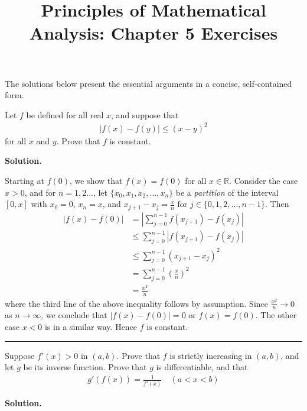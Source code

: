 \documentclass[12pt]{article}
\title{Principles of Mathematical Analysis: Chapter 5 Exercises}
\date{}
\theoremstyle{definition}
\begin{document}
\maketitle
\noindent The solutions below present the essential arguments in a concise, self-contained form.

Let $f$ be defined for all real $x$, and suppose that
\begin{align*}
\left\vert f(x)-f(y)\right\vert\le(x-y)^2
\end{align*}
for all $x$ and $y$. Prove that $f$ is constant.

\smallskip
\noindent\textbf{Solution.}\quad

Starting at $f(0)$, we show that $f(x)=f(0)$ for all $x\in \mathbb{R}$. Consider the case $x>0$, and for $n=1,2\ldots$, let $\{x_0,x_1,x_2,\ldots,x_n\}$ be a \textit{partition} of the interval $[0,x]$ with $x_0=0$, $x_n=x$, and $x_{j+1}-x_j=\frac{x}{n}$ for $j\in\{0,1,2,\ldots,n-1\}$. Then
\begin{align*}
\left\vert f(x)-f(0)\right\vert
&=\left\vert \sum_{j=0}^{n-1}f(x_{j+1})-f(x_j)\right\vert \\
&\le\sum_{j=0}^{n-1}\left\vert f(x_{j+1})-f(x_j)\right\vert \\
&\le\sum_{j=0}^{n-1}\left(x_{j+1}-x_j\right)^2 \\
&=\sum_{j=0}^{n-1}\left(\frac{x}{n}\right)^2 \\
&=\frac{x^2}{n}
\end{align*}
where the third line of the above inequality follows by assumption. Since $\frac{x^2}{n}\to 0$ as $n\to\infty$, we conclude that $\left\vert f(x)-f(0)\right\vert=0$ or $f(x)=f(0)$. The other case $x<0$ is in a similar way. Hence $f$ is constant.



\bigskip\noindent\hrule\bigskip

Suppose $f'(x)>0$ in $(a,b)$. Prove that $f$ is strictly increasing in $(a,b)$, and let $g$ be its inverse function. Prove that $g$ is differentiable, and that
\begin{align*}
g'(f(x))=\frac{1}{f'(x)}\quad(a<x<b)
\end{align*}

\smallskip
\noindent\textbf{Solution.}\quad
\end{document}
